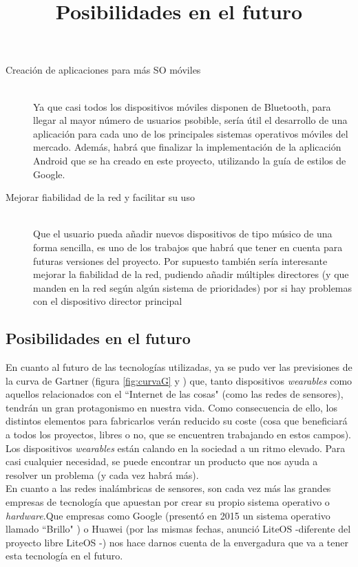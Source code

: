 \begin{description}
    \item[Creación de aplicaciones para más SO móviles] \hfill \\
      Ya que casi todos los dispositivos móviles disponen de Bluetooth, para llegar al mayor número de usuarios
      psobible, sería útil el desarrollo de una aplicación para cada uno de los principales sistemas operativos
      móviles del mercado. Además, habrá que finalizar la implementación de la aplicación Android que se ha creado
      en este proyecto, utilizando la guía de estilos de Google.

     \item[Mejorar fiabilidad de la red y facilitar su uso] \hfill \\
      Que el usuario pueda añadir nuevos dispositivos de tipo músico de una forma sencilla, es uno de los
      trabajos que habrá que tener en cuenta para futuras versiones del proyecto. Por supuesto
      también sería interesante mejorar la fiabilidad de la red, pudiendo añadir múltiples directores
      (y que manden en la red según algún sistema de prioridades) por si hay problemas con el
      dispositivo director principal

\end{description}

\subsection{Posibilidades en el futuro}
\title{Posibilidades en el futuro}
En cuanto al futuro de las tecnologías utilizadas, ya se pudo ver las previsiones
de la curva de Gartner (figura \ref{fig:curvaG} y \cite{gartnercurve}) que, tanto dispositivos \textit{wearables} como
aquellos relacionados con el ``Internet de las cosas" (como las redes de sensores), tendrán un gran protagonismo
en nuestra vida. Como consecuencia de ello, los distintos elementos para fabricarlos
verán reducido su coste (cosa que beneficiará a todos los proyectos, libres o no, que se encuentren trabajando en estos
campos).\\

Los dispositivos \textit{wearables} están calando en la sociedad a un ritmo elevado. Para casi
cualquier necesidad, se puede encontrar un producto que nos ayuda a resolver un problema (y cada vez habrá más).\\

En cuanto a las redes inalámbricas de sensores, son cada vez más las grandes empresas
de tecnología que apuestan por crear su propio sistema operativo o \textit{hardware}.Que empresas como Google (presentó
en 2015 un sistema operativo llamado ``Brillo" \cite{brillo}) o Huawei (por las mismas fechas, anunció LiteOS -diferente
del proyecto libre LiteOS \cite{liteos}-) nos hace darnos cuenta de la envergadura que
va a tener esta tecnología en el futuro.\\



